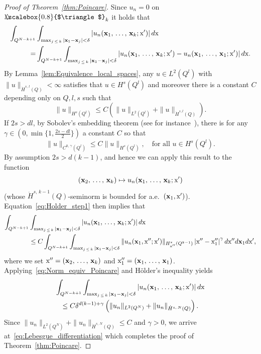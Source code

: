 \documentclass[AHL, Unicode, longabstracts, published]{cedram}
\newcommand\1{{\ensuremath {\mathds 1} }}
\newcommand{\bx}{\mathbf{x}}
\newcommand{\sx}{\textup{x}}
\newcommand{\bDelta}{{\mbox{$\triangle$}\hspace{-8.6pt}\scalebox{0.8}{$\triangle$}}}
\begin{document}
\begin{proof}[Proof of Theorem~\ref{thm:Poincare}]
Since $u_n=0$ on $\bDelta_k$ it holds that
\begin{equation}\label{eq:Holder_step1}
\begin{aligned}
\int_{Q^{N-k+1}}&\int_{\max_{j\,\leq\,k}|\bx_1-\bx_j|< \delta}|u_n(\bx_1,\,\ldots,\,\bx_k; \sx')| \,d\sx\\
=
&\int_{Q^{N-k+1}}\int_{\max_{j\,\leq\,k}|\bx_1-\bx_j|< \delta}|u_n(\bx_1,\,\ldots,\,\bx_k; \sx')-u_n(\bx_1,\, \ldots,\,\bx_1; \sx')| \,d\sx.
\end{aligned}
\end{equation}
By Lemma~\ref{lem:Equivalence_local_spaces}, any $u\in L^2(Q^{l})$ with $\|u\|_{\dot{H}^{s,\,l}(Q)}<\infty$ satisfies that $u\in H^s(Q^{l})$ and moreover there is a constant $C$ depending only on $Q, l, s$ such that
\begin{equation}\label{eq:Norm_equiv_Poincare}
\|u\|_{H^s(Q^{l})}\leq C\left(\|u\|_{L^2(Q^l)}+\|u\|_{\dot{H}^{s,l}(Q)}\right).
\end{equation}
If $2s>dl$, by Sobolev's embedding theorem (see for instance~\cite[Theorem~8.2]{Hitchhikers}), there is for any $\gamma\in (0, \min\{1, \tfrac{2s-dl}{2}\})$ a constant $C$ so that
\begin{equation*}
\|u\|_{C^{0,\,\gamma}(Q^l)}\leq C \|u\|_{H^s(Q^l)}, \quad \text{for all }u\in H^s\left(Q^l\right).
\end{equation*}
By assumption $2s>d(k-1)$, and hence we can apply this result to the function
\begin{equation*}
(\bx_2,\,\ldots,\,\bx_k)\mapsto u_n(\bx_1,\,\ldots,\, \bx_k; \sx')
\end{equation*}
(whose $\dot{H}^{s,\,k-1}(Q)$-seminorm is bounded for a.e.~$(\bx_1, \sx')$). Equation~\eqref{eq:Holder_step1} then implies that
\begin{align*}
\int_{Q^{N-k+1}}&\int_{\max_{j\,\leq\,k}|\bx_1-\bx_j|< \delta}|u_n(\bx_1,\,\ldots,\,\bx_k; \sx')| \,d\sx\\
&\leq C\int_{Q^{N-k+1}}\int_{\max_{j\,\leq\,k}|\bx_1-\bx_j|< \delta} \|u_n(\bx_1, \sx''; \sx')\|_{H^s_{\sx''}(Q^{k-1})}\left|\sx''-\sx''_1\right|^\gamma d\sx'' d\bx_1 d\sx',
\end{align*}
where we set $\sx''=(\bx_2,\,\ldots,\,\bx_k)$ and $\sx''_1=(\bx_1,\,\ldots,\,\bx_1)$. Applying~\eqref{eq:Norm_equiv_Poincare} and H\"older's inequality yields
\begin{multline*}
\int_{Q^{N-k+1}}\int_{\max_{j\,\leq\,k}|\bx_1-\bx_j|< \delta}|u_n(\bx_1,\,\ldots,\,\bx_k; \sx')| \,d\sx\\
\leq C\delta^{d(k-1)+\gamma}\left(\|u_n\|_{L^2(Q^N)}+\|u_n\|_{\dot{H}^{s,\,N}(Q)}\right).
\end{multline*}
Since $\|u_n\|_{L^2(Q^N)}+\|u_n\|_{\dot{H}^{s,\,N}(Q)}\leq C$ and $\gamma>0$, we arrive at~\eqref{eq:Lebesgue_differentiation} which completes the proof of Theorem~\ref{thm:Poincare}.
\end{proof}
\end{document}
